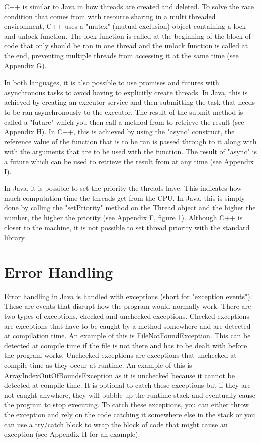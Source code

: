 \documentclass[]{report}
\begin{document}
C++ is similar to Java in how threads are created and deleted. To solve the race condition that comes from with resource sharing in a multi threaded environment, C++ uses a "mutex" (mutual exclusion) object containing a lock and unlock function. The lock function is called at the beginning of the block of code that only should be ran in one thread and the unlock function is called at the end, preventing multiple threads from accessing it at the same time (see Appendix G).\cite{ConcurrencyC++}

In both languages, it is also possible to use promises and futures with asynchronous tasks to avoid having to explicitly create threads. In Java, this is achieved by creating an executor service and then submitting the task that needs to be ran asynchronously to the executor. The result of the submit method is called a "future" which you then call a method from to retrieve the result (see Appendix H). In C++, this is achieved by using the "async" construct, the reference value of the function that is to be ran is passed through to it along with with the arguments that are to be used with the function. The result of "async" is a future which can be used to retrieve the result from at any time (see Appendix I).

In Java, it is possible to set the priority the threads have. This indicates how much computation time the threads get from the CPU. In Java, this is simply done by calling the "setPriority" method on the Thread object and the higher the number, the higher the priority (see Appendix F, figure 1). Although C++ is closer to the machine, it is not possible to set thread priority with the standard library.

\section{Error Handling}
Error handling in Java is handled with exceptions (short for "exception events"). These are events that disrupt how the program would normally work. There are two types of exceptions, checked and unchecked exceptions. Checked exceptions are exceptions that have to be caught by a method somewhere and are detected at compilation time. An example of this is FileNotFoundException. This can be detected at compile time if the file is not there and has to be dealt with before the program works. Unchecked exceptions are exceptions that unchecked at compile time as they occur at runtime. An example of this is ArrayIndexOutOfBoundsException as it is unchecked because it cannot be detected at compile time. It is optional to catch these exceptions but if they are not caught anywhere, they will bubble up the runtime stack and eventually cause the program to stop executing. To catch these exceptions, you can either throw the exception and rely on the code catching it somewhere else in the stack or you can use a try/catch block to wrap the block of code that might cause an exception (see Appendix H for an example).\cite{ExceptionsJava}
\end{document}
